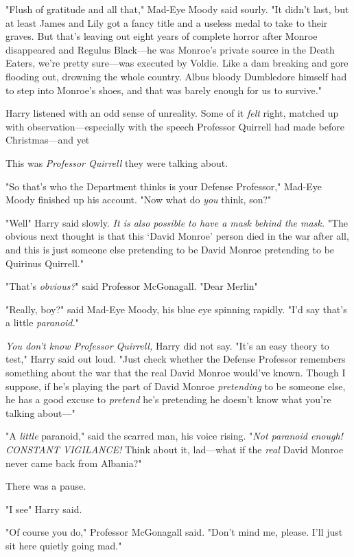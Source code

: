 "Flush of gratitude and all that," Mad-Eye Moody said sourly. "It didn't last,
but at least James and Lily got a fancy title and a useless medal to take to
their graves. But that's leaving out eight years of complete horror after
Monroe disappeared and Regulus Black---he was Monroe's private source in the
Death Eaters, we're pretty sure---was executed by Voldie. Like a dam breaking
and gore flooding out, drowning the whole country. Albus bloody Dumbledore
himself had to step into Monroe's shoes, and that was barely enough for us to
survive."

Harry listened with an odd sense of unreality. Some of it \emph{felt} right,
matched up with observation---especially with the speech Professor Quirrell had
made before Christmas---and yet{\el}

This was \emph{Professor Quirrell} they were talking about.

"So that's who the Department thinks is your Defense Professor," Mad-Eye Moody
finished up his account. "Now what do \emph{you} think, son?"

"Well{\el}" Harry said slowly. \emph{It is also possible to have a mask
behind the mask.} "The obvious next thought is that this `David Monroe' person
died in the war after all, and this is just someone else pretending to be David
Monroe pretending to be Quirinus Quirrell."

"That's \emph{obvious?}" said Professor McGonagall. "Dear Merlin{\el}"

"Really, boy?" said Mad-Eye Moody, his blue eye spinning rapidly. "I'd say
that's a little{\el} \emph{paranoid.}"

\emph{You don't know Professor Quirrell,} Harry did not say. "It's an easy
theory to test," Harry said out loud. "Just check whether the Defense Professor
remembers something about the war that the real David Monroe would've known.
Though I suppose, if he's playing the part of David Monroe \emph{pretending} to
be someone else, he has a good excuse to \emph{pretend} he's pretending he
doesn't know what you're talking about---"

"A \emph{little} paranoid," said the scarred man, his voice rising. "\emph{Not
paranoid enough! CONSTANT VIGILANCE!} Think about it, lad---what if the
\emph{real} David Monroe never came back from Albania?"

There was a pause.

"I see{\el}" Harry said.

"Of course you do," Professor McGonagall said. "Don't mind me, please. I'll
just sit here quietly going mad."


